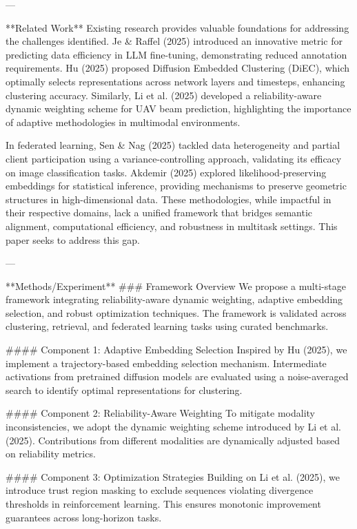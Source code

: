 ---

**Related Work**  
Existing research provides valuable foundations for addressing the challenges identified. Je & Raffel (2025) introduced an innovative metric for predicting data efficiency in LLM fine-tuning, demonstrating reduced annotation requirements. Hu (2025) proposed Diffusion Embedded Clustering (DiEC), which optimally selects representations across network layers and timesteps, enhancing clustering accuracy. Similarly, Li et al. (2025) developed a reliability-aware dynamic weighting scheme for UAV beam prediction, highlighting the importance of adaptive methodologies in multimodal environments.

In federated learning, Sen & Nag (2025) tackled data heterogeneity and partial client participation using a variance-controlling approach, validating its efficacy on image classification tasks. Akdemir (2025) explored likelihood-preserving embeddings for statistical inference, providing mechanisms to preserve geometric structures in high-dimensional data. These methodologies, while impactful in their respective domains, lack a unified framework that bridges semantic alignment, computational efficiency, and robustness in multitask settings. This paper seeks to address this gap.

---

**Methods/Experiment**  
### Framework Overview  
We propose a multi-stage framework integrating reliability-aware dynamic weighting, adaptive embedding selection, and robust optimization techniques. The framework is validated across clustering, retrieval, and federated learning tasks using curated benchmarks.

#### Component 1: Adaptive Embedding Selection  
Inspired by Hu (2025), we implement a trajectory-based embedding selection mechanism. Intermediate activations from pretrained diffusion models are evaluated using a noise-averaged search to identify optimal representations for clustering.

#### Component 2: Reliability-Aware Weighting  
To mitigate modality inconsistencies, we adopt the dynamic weighting scheme introduced by Li et al. (2025). Contributions from different modalities are dynamically adjusted based on reliability metrics.

#### Component 3: Optimization Strategies  
Building on Li et al. (2025), we introduce trust region masking to exclude sequences violating divergence thresholds in reinforcement learning. This ensures monotonic improvement guarantees across long-horizon tasks.

